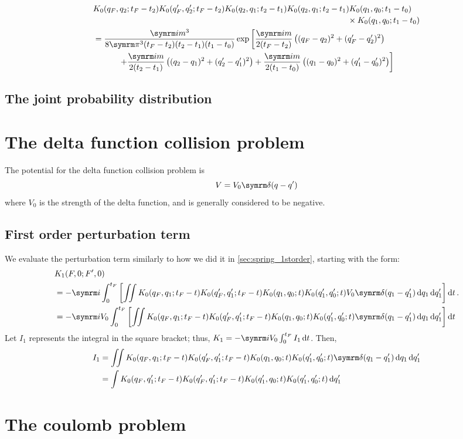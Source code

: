 \begin{align}
    &\begin{multlined}[t]
        K_0(q_F, q_2; t_F - t_2)K_0(q_F', q_2'; t_F - t_2)K_0(q_2, q_1; t_2 - t_1)K_0(q_2, q_1; t_2 - t_1)K_0(q_1, q_0; t_1 - t_0) \\ \times K_0(q_1, q_0; t_1 - t_0)
    \end{multlined} \nonumber \\
    &= \begin{multlined}[t]
        \frac{\im m^3}{8\cpi^3(t_F - t_2)(t_2 - t_1)(t_1 - t_0)}\exp \left[\frac{\im m}{2(t_F - t_2)}\left((q_F - q_2)^2 + (q_F' - q_2')^2\right) \right. \\ \left. + \frac{\im m}{2(t_2 - t_1)}\left((q_2 - q_1)^2 + (q_2' - q_1')^2\right) + \frac{\im m}{2(t_1 - t_0)}\left((q_1 - q_0)^2 + (q_1' - q_0')^2\right)\right]
    \end{multlined}
\end{align}

\subsection{The joint probability distribution}

\section{The delta function collision problem}

The potential for the delta function collision problem is
\begin{equation}
    V = V_0\ddel(q - q')
\end{equation}
where $V_0$ is the strength of the delta function, and is generally considered to be negative.

\subsection{First order perturbation term}

We evaluate the perturbation term similarly to how we did it in \cref{sec:spring_1storder}, starting with the form:
\begin{align}
    &K_1(F, 0; F', 0) \\
    &= -\im\int_0^{t_F}\left[\iint K_0(q_F, q_1; t_F - t)K_0(q_F', q_1'; t_F - t)K_0(q_1, q_0; t)K_0(q_1', q_0'; t)V_0\ddel(q_1 - q_1')\dd{q_1}\dd{q_1'}\right]\dd{t}. \nonumber \\
    &= -\im V_0\int_0^{t_F}\left[\iint K_0(q_F, q_1; t_F - t)K_0(q_F', q_1'; t_F - t)K_0(q_1, q_0; t)K_0(q_1', q_0'; t)\ddel(q_1 - q_1')\dd{q_1}\dd{q_1'}\right]\dd{t} \nonumber
\end{align}
Let $I_1$ represents the integral in the square bracket; thus, $K_1 = -\im V_0\int_{0}^{t_F}I_1\dd{t}$. Then,
\begin{align}
    I_1 &= \iint K_0(q_F, q_1; t_F - t)K_0(q_F', q_1'; t_F - t)K_0(q_1, q_0; t)K_0(q_1', q_0'; t)\ddel(q_1 - q_1')\dd{q_1}\dd{q_1'} \\
    &= \int K_0(q_F, q_1'; t_F - t)K_0(q_F', q_1'; t_F - t)K_0(q_1', q_0; t)K_0(q_1', q_0'; t)\dd{q_1'}
\end{align}

\section{The coulomb problem}